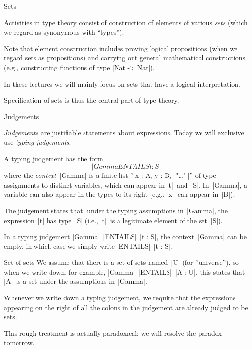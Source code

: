 \documentclass[t,compress,hyperref={hidelinks}]{beamer}
\begin{document}
\begin{frame}{Sets}

Activities in type theory consist of construction of elements of various \emph{sets} (which we regard as synonymous with ``types'').

Note that element construction includes proving logical propositions (when we regard sets as propositions) and carrying out general mathematical constructions (e.g., constructing functions of type |Nat -> Nat|).

In these lectures we will mainly focus on sets that have a logical interpretation.

Specification of sets is thus the central part of type theory.

\end{frame}

\begin{frame}{Judgements}

\emph{Judgements} are justifiable statements about expressions.
Today we will exclusive use \emph{typing judgements}.

A typing judgement has the form
\[ |Gamma ENTAILS t : S| \]
where the \emph{context}~|Gamma| is a finite list ``|x : A, y : B, {-"\text\ldots"-}|'' of type assignments to distinct variables, which can appear in |t|~and~|S|.
In~|Gamma|, a variable can also appear in the types to its right (e.g., |x|~can appear in~|B|).

The judgement states that, under the typing assumptions in~|Gamma|, the expression~|t| has type~|S| (i.e., |t|~is a legitimate element of the set~|S|).

In a typing judgement |Gamma|~|ENTAILS|~|t : S|, the context~|Gamma| can be empty, in which case we simply write |ENTAILS|~|t : S|.

\end{frame}

\begin{frame}{Set of sets}
We assume that there is a set of sets named~|U| (for ``universe''), so when we write down, for example, |Gamma|~|ENTAILS|~|A : U|, this states that |A|~is a set under the assumptions in~|Gamma|.

Whenever we write down a typing judgement, we require that the expressions appearing on the right of all the colons in the judgement are already judged to be sets.

 This rough treatment is actually paradoxical; we will resolve the paradox tomorrow.

\end{frame}
\end{document}
